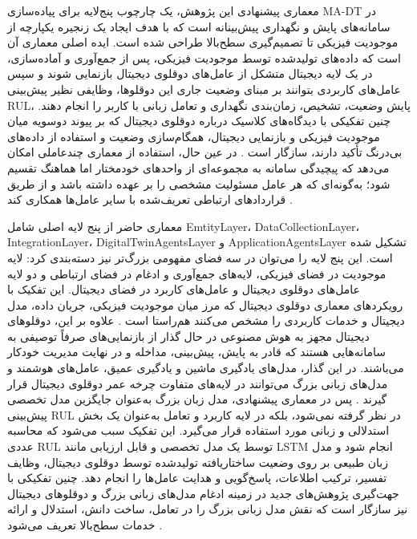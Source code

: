 معماری پیشنهادی این پژوهش، یک چارچوب پنج‌لایه برای پیاده‌سازی \gls{MA-DT} در سامانه‌های پایش و نگهداری پیش‌بینانه است که با هدف ایجاد یک زنجیره یکپارچه از موجودیت فیزیکی تا تصمیم‌گیری سطح‌بالا طراحی شده است. ایده اصلی معماری آن است که داده‌های تولیدشده توسط موجودیت فیزیکی، پس از جمع‌آوری و آماده‌سازی، در یک لایه دیجیتال متشکل از عامل‌های دوقلوی دیجیتال بازنمایی شوند و سپس عامل‌های کاربردی بتوانند بر مبنای وضعیت جاری این دوقلوها، وظایفی نظیر پیش‌بینی \gls{RUL}، پایش وضعیت، تشخیص، زمان‌بندی نگهداری و تعامل زبانی با کاربر را انجام دهند. چنین تفکیکی با دیدگاه‌های کلاسیک درباره دوقلوی دیجیتال که بر پیوند دوسویه میان موجودیت فیزیکی و بازنمایی دیجیتال، همگام‌سازی وضعیت و استفاده از داده‌های بی‌درنگ تأکید دارند، سازگار است \cite{tao2019digital,barricelli2019survey,fuller2020digital,qi2021enabling}. در عین حال، استفاده از معماری چندعاملی امکان می‌دهد که پیچیدگی سامانه به مجموعه‌ای از واحدهای خودمختار اما هماهنگ تقسیم شود؛ به‌گونه‌ای که هر عامل مسئولیت مشخصی را بر عهده داشته باشد و از طریق قراردادهای ارتباطی تعریف‌شده با سایر عامل‌ها همکاری کند \cite{dorri2018multiagent,pretel2022masdt,lopez2024madtwin,wang2024multiagent}.

معماری حاضر از پنج لایه اصلی شامل \gls{EmtityLayer}، \gls{DataCollectionLayer}، \gls{IntegrationLayer}، \gls{DigitalTwinAgentsLayer} و \gls{ApplicationAgentsLayer} تشکیل شده است. این پنج لایه را می‌توان در سه فضای مفهومی بزرگ‌تر نیز دسته‌بندی کرد: لایه موجودیت در فضای فیزیکی، لایه‌های جمع‌آوری و ادغام در فضای ارتباطی و دو لایه عامل‌های دوقلوی دیجیتال و عامل‌های کاربرد در فضای دیجیتال. این تفکیک با رویکردهای معماری دوقلوی دیجیتال که مرز میان موجودیت فیزیکی، جریان داده، مدل دیجیتال و خدمات کاربردی را مشخص می‌کنند هم‌راستا است \cite{tao2019digital,qi2021enabling}. علاوه بر این، دوقلوهای دیجیتال مجهز به هوش مصنوعی در حال گذار از بازنمایی‌های صرفاً توصیفی به سامانه‌هایی هستند که قادر به پایش، پیش‌بینی، مداخله و در نهایت مدیریت خودکار می‌باشند. در این گذار، مدل‌های یادگیری ماشین و یادگیری عمیق، عامل‌های هوشمند و مدل‌های زبانی بزرگ می‌توانند در لایه‌های متفاوت چرخه عمر دوقلوی دیجیتال قرار گیرند \cite{zhou2026dtai,fu2026genaidt}. پس در معماری پیشنهادی، مدل زبان بزرگ به‌عنوان جایگزین مدل تخصصی پیش‌بینی \gls{RUL} در نظر گرفته نمی‌شود، بلکه در لایه کاربرد و تعامل به‌عنوان یک بخش استدلالی و زبانی مورد استفاده قرار می‌گیرد. این تفکیک سبب می‌شود که محاسبه عددی \gls{RUL} توسط یک مدل تخصصی و قابل ارزیابی مانند LSTM انجام شود و مدل زبان طبیعی بر روی وضعیت ساختاریافته تولیدشده توسط دوقلوی دیجیتال، وظایف تفسیر، ترکیب اطلاعات، پاسخ‌گویی و هدایت عامل‌ها را انجام دهد. چنین تفکیکی با جهت‌گیری پژوهش‌های جدید در زمینه ادغام مدل‌های زبانی بزرگ و دوقلو‌های دیجیتال نیز سازگار است که نقش مدل زبانی بزرگ را در تعامل، ساخت دانش، استدلال و ارائه خدمات سطح‌بالا تعریف می‌شود \cite{CHEN2025102982LLMDT,zhou2026dtai,maghanaki2026llmmanufacturing}.


